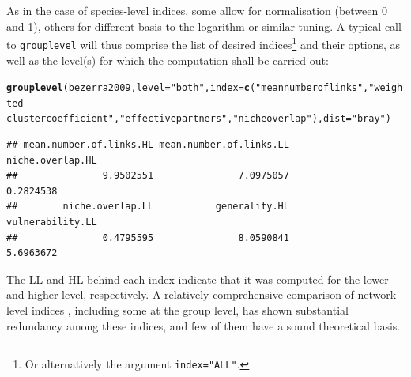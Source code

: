 \documentclass[a4paper, 11pt]{article}\usepackage[]{graphicx}\usepackage[dvipsnames]{xcolor}
\makeatletter
\newcommand{\hlstr}[1]{\textcolor[rgb]{0.192,0.494,0.8}{#1}}%
\newcommand{\hlstd}[1]{\textcolor[rgb]{0.345,0.345,0.345}{#1}}%
\newcommand{\hlkwc}[1]{\textcolor[rgb]{0.333,0.667,0.333}{#1}}%
\newcommand{\hlkwd}[1]{\textcolor[rgb]{0.737,0.353,0.396}{\textbf{#1}}}%
\newenvironment{kframe}{%
 \def\at@end@of@kframe{}%
 \ifinner\ifhmode%
  \def\at@end@of@kframe{\end{minipage}}%
  \begin{minipage}{\columnwidth}%
 \fi\fi%
 \def\FrameCommand##1{\hskip\@totalleftmargin \hskip-\fboxsep
 \colorbox{shadecolor}{##1}\hskip-\fboxsep
     \hskip-\linewidth \hskip-\@totalleftmargin \hskip\columnwidth}%
 \MakeFramed {\advance\hsize-\width
   \@totalleftmargin\z@ \linewidth\hsize
   \@setminipage}}%
 {\par\unskip\endMakeFramed%
 \at@end@of@kframe}
\newenvironment{knitrout}{}{} %
\makeatother
\begin{document}
\noindent As in the case of species-level indices, some allow for normalisation (between 0 and 1), others for different basis to the logarithm or similar tuning. A typical call to \texttt{grouplevel} will thus comprise the list of desired indices\footnote{Or alternatively the argument \texttt{index="ALL"}.} and their options, as well as the level(s) for which the computation shall be carried out:
\begin{knitrout}
\color{fgcolor}\begin{kframe}
\begin{alltt}
\hlkwd{grouplevel}\hlstd{(bezerra2009,} \hlkwc{level}\hlstd{=}\hlstr{"both"}\hlstd{,} \hlkwc{index}\hlstd{=}\hlkwd{c}\hlstd{(}\hlstr{"mean number of links"}\hlstd{,} \hlstr{"weighted 
     cluster coefficient"}\hlstd{,} \hlstr{"effective partners"}\hlstd{,} \hlstr{"niche overlap"}\hlstd{),} \hlkwc{dist}\hlstd{=}\hlstr{"bray"}\hlstd{)}
\end{alltt}
\begin{verbatim}
## mean.number.of.links.HL mean.number.of.links.LL        niche.overlap.HL 
##               9.9502551               7.0975057               0.2824538 
##        niche.overlap.LL           generality.HL        vulnerability.LL 
##               0.4795595               8.0590841               5.6963672
\end{verbatim}
\end{kframe}
\end{knitrout}
The LL and HL behind each index indicate that it was computed for the lower and higher level, respectively. A relatively comprehensive comparison of network-level indices \citep{Dormann2009}, including some at the group level, has shown substantial redundancy among these indices, and few of them have a sound theoretical basis.
\end{document}
